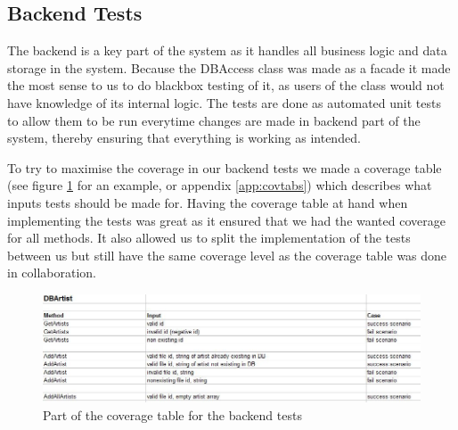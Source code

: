 \subsection{Backend Tests}
The backend is a key part of the system as it handles all business logic and data storage in the system. Because 
the DBAccess class was made as a facade it made the most sense to us to do blackbox testing of it, as users of
the class would not have knowledge of its internal logic. The tests are done as automated unit tests to allow them
to be run everytime changes are made in backend part of the system, thereby ensuring that everything is working as
intended.

To try to maximise the coverage in our backend tests we made a coverage table (see figure \ref{fig:covtabs} for an example,
or appendix \ref{app:covtabs}) which describes what inputs tests should be made for. Having the coverage table at hand
when implementing the tests was great as it ensured that we had the wanted coverage for all methods. It also allowed us
 to split the implementation of the tests between us but still have the same coverage level as the coverage table was done
 in collaboration.

\begin{figure}[hbt]
	\centering
	\includegraphics[scale=0.5]{./testing/coverage.jpg}
	\caption{Part of the coverage table for the backend tests}
	\label{fig:covtabs}
\end{figure}
  
